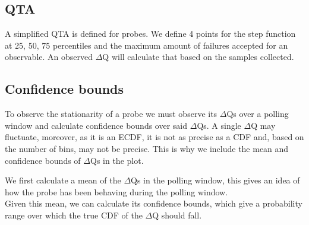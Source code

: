     \subsection{QTA}
        A simplified QTA is defined for probes. We define 4 points for the step function at 25, 50, 75 percentiles and the maximum amount of failures accepted for an observable. An observed $\Delta$Q will calculate that based on the samples collected. 

\subsection{Confidence bounds}
    To observe the stationarity of a probe we must observe its $\Delta$Qs over a polling window and calculate confidence bounds over said $\Delta$Qs. A single $\Delta$Q may fluctuate, moreover, as it is an ECDF, it is not as precise as a CDF and, based on the number of bins, may not be precise. This is why we include the mean and confidence bounds of $\Delta$Qs in the plot.

    We first calculate a mean of the $\Delta$Qs in the polling window, this gives an idea of how the probe has been behaving during the polling window. \\
    Given this mean, we can calculate its confidence bounds, which give a probability range over which the true CDF of the $\Delta$Q should fall. \cite{conf-b}

